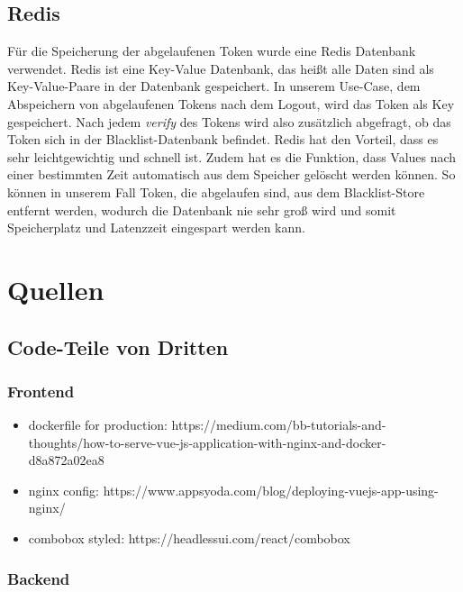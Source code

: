 \documentclass[a4paper, 12pt]{article}
\begin{document}
    \subsection{Redis}
    Für die Speicherung der abgelaufenen Token wurde eine Redis Datenbank verwendet. Redis ist eine Key-Value Datenbank, das heißt alle Daten sind als
    Key-Value-Paare in der Datenbank gespeichert. In unserem Use-Case, dem Abspeichern von abgelaufenen Tokens nach dem Logout, wird das Token als
    Key gespeichert. Nach jedem {\it verify} des Tokens wird also zusätzlich abgefragt, ob das Token sich in der Blacklist-Datenbank befindet.
    Redis hat den Vorteil, dass es sehr leichtgewichtig und schnell ist. Zudem hat es die Funktion, dass Values nach einer bestimmten Zeit automatisch
    aus dem Speicher gelöscht werden können. So können in unserem Fall Token, die abgelaufen sind, aus dem Blacklist-Store entfernt werden, wodurch die
    Datenbank nie sehr groß wird und somit Speicherplatz und Latenzzeit eingespart werden kann.

    \newpage
    \section{Quellen}
    \subsection{Code-Teile von Dritten}
    \subsubsection{Frontend}
\begin{itemize}
  \item dockerfile for production: https://medium.com/bb-tutorials-and-thoughts/how-to-serve-vue-js-application-with-nginx-and-docker-d8a872a02ea8
  \item nginx config: https://www.appsyoda.com/blog/deploying-vuejs-app-using-nginx/
  \item combobox styled: https://headlessui.com/react/combobox
\end{itemize}

    \subsubsection{Backend}
\end{document}
